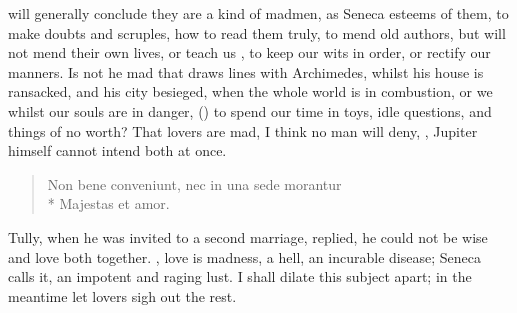 {will generally conclude they are a kind of madmen, as  Seneca
esteems of them, to make doubts and scruples, how to read them truly,
to mend old authors, but will not mend their own lives, or teach us
, to keep our wits in order, or rectify our manners.  Is not he mad that
draws lines with Archimedes, whilst his house is ransacked, and his
city besieged, when the whole world is in combustion, or we whilst our
souls are in danger, () to spend our time in
toys, idle questions, and things of no worth?
That lovers are mad, I think no man will deny, , Jupiter himself cannot intend both at
once.

\begin{verse}
\textlatin{Non bene conveniunt, nec in una sede morantur}\\*
\textlatin{Majestas et amor.}
\end{verse}

Tully, when he was invited to a second marriage, replied, he could not
 be wise and love both together. , love is madness, a
hell, an incurable disease;  Seneca
calls it, an impotent and raging lust. I shall dilate this subject
apart; in the meantime let lovers sigh out the rest.

}
